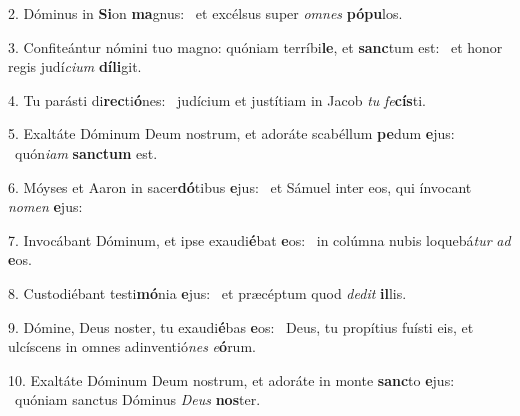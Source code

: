 2. Dóminus in \textbf{Si}on \textbf{ma}gnus: \ast\  et excélsus super \textit{om}\textit{nes} \textbf{pó}\textbf{pu}los.\

3. Confiteántur nómini tuo magno: quóniam terríbi\textbf{le}, et \textbf{sanc}tum est: \ast\  et honor regis judí\textit{ci}\textit{um} \textbf{dí}\textbf{li}git.\

4. Tu parásti di\textbf{rec}ti\textbf{ó}nes: \ast\  judícium et justítiam in Jacob \textit{tu} \textit{fe}\textbf{cís}ti.\

5. Exaltáte Dóminum Deum nostrum, et adoráte scabéllum \textbf{pe}dum \textbf{e}jus: \ast\  quón\textit{i}\textit{am} \textbf{sanc}\textbf{tum} est.\

6. Móyses et Aaron in sacer\textbf{dó}tibus \textbf{e}jus: \ast\  et Sámuel inter eos, qui ínvocant \textit{no}\textit{men} \textbf{e}jus:\

7. Invocábant Dóminum, et ipse exaudi\textbf{é}bat \textbf{e}os: \ast\  in colúmna nubis loquebá\textit{tur} \textit{ad} \textbf{e}os.\

8. Custodiébant testi\textbf{mó}nia \textbf{e}jus: \ast\  et præcéptum quod \textit{de}\textit{dit} \textbf{il}lis.\

9. Dómine, Deus noster, tu exaudi\textbf{é}bas \textbf{e}os: \ast\  Deus, tu propítius fuísti eis, et ulcíscens in omnes adinventió\textit{nes} \textit{e}\textbf{ó}rum.\

10. Exaltáte Dóminum Deum nostrum, et adoráte in monte \textbf{sanc}to \textbf{e}jus: \ast\  quóniam sanctus Dóminus \textit{De}\textit{us} \textbf{nos}ter.\

